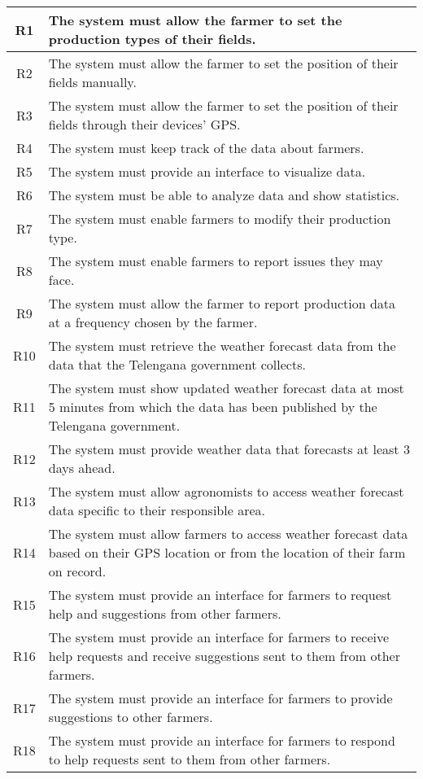 \begin{center}
\begin{longtable}{|c|>{\raggedright\arraybackslash}m{15cm}|}
 
R1	& The system must allow the farmer to set the production types of their fields.\\\hline
R2	& The system must allow the farmer to set the position of their fields manually.\\\hline
R3	& The system must allow the farmer to set the position of their fields through their devices' GPS.\\\hline
R4	& The system must keep track of the data about farmers.\\\hline
R5	& The system must provide an interface to visualize data.\\\hline
R6	& The system must be able to analyze data and show statistics.\\\hline
R7	& The system must enable farmers to modify their production type.\\\hline
R8	& The system must enable farmers to report issues they may face. \\\hline
R9	& The system must allow the farmer to report production data at a frequency chosen by the farmer. \\\hline
R10	& The system must retrieve the weather forecast data from the data that the Telengana government collects.\\\hline
R11	& The system must show updated weather forecast data at most 5 minutes from which the data has been published by the Telengana government.\\\hline
R12	& The system must provide weather data that forecasts at least 3 days ahead.\\\hline
R13	& The system must allow agronomists to access weather forecast data specific to their responsible area.\\\hline
R14	& The system must allow farmers to access weather forecast data based on their GPS location or from the location of their farm on record.\\\hline
R15	& The system must provide an interface for farmers to request help and suggestions from other farmers.\\\hline
R16	& The system must provide an interface for farmers to receive help requests and receive suggestions sent to them from other farmers.\\\hline
R17	& The system must provide an interface for farmers to provide suggestions to other farmers.\\\hline
R18	& The system must provide an interface for farmers to respond to help requests sent to them from other farmers.\\\hline

\end{longtable}
\end{center}
